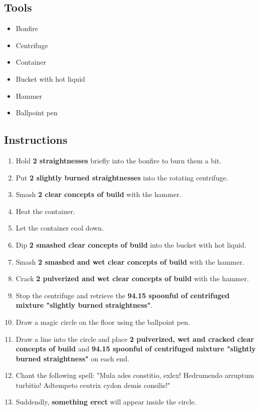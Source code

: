 \documentclass{article}
\begin{document}
\subsection{Tools}\begin{itemize}
\item 
Bonfire
\item 
Centrifuge
\item 
Container
\item 
Bucket with hot liquid
\item 
Hammer
\item 
Ballpoint pen
\end{itemize}
\subsection{Instructions}\begin{enumerate}
\item 
Hold \textbf{2 straightnesses} briefly into the bonfire to burn them a bit.
\item 
Put \textbf{2 slightly burned straightnesses} into the rotating centrifuge.
\item 
Smash \textbf{2 clear concepts of build} with the hammer.
\item 
Heat the container.
\item 
Let the container cool down.
\item 
Dip \textbf{2 smashed clear concepts of build} into the bucket with hot liquid.
\item 
Smash \textbf{2 smashed and wet clear concepts of build} with the hammer.
\item 
Crack \textbf{2 pulverized and wet clear concepts of build} with the hammer.
\item 
Stop the centrifuge and retrieve the \textbf{94.15 spoonful of centrifuged mixture "slightly burned straightness"}.
\item 
Draw a magic circle on the floor using the ballpoint pen.
\item 
Draw a line into the circle and place \textbf{2 pulverized, wet and cracked clear concepts of build} and \textbf{94.15 spoonful of centrifuged mixture "slightly burned straightness"} on each end.
\item 
Chant the following spell: "Mula ades constitio, exlex! Hedrumendo arruptum turbitio! Adtempeto ceutrix cydon demis consilis!"
\item 
Suddendly, \textbf{something erect} will appear inside the circle.
\end{enumerate}
\newpage
\end{document}
